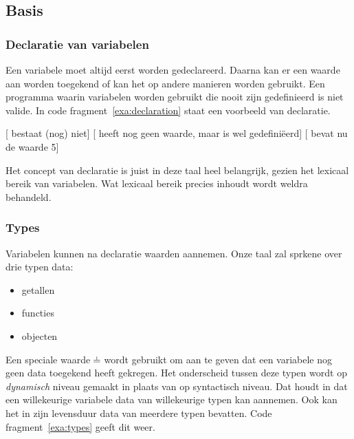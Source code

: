 \subsection{Basis}

\subsubsection{Declaratie van variabelen}

Een variabele moet altijd eerst worden gedeclareerd. Daarna kan er een waarde aan worden toegekend of kan het op andere manieren worden gebruikt. Een programma waarin variabelen worden gebruikt die nooit zijn gedefinieerd is niet valide. In code fragment~\ref{exa:declaration} staat een voorbeeld van declaratie.

\begin{NoBreak}
\codeFragmentCaption
\begin{codelines}
  \codeLine{}[ bestaat (nog) niet]
  [ heeft nog geen waarde, maar is wel gedefiniëerd]
  [ bevat nu de waarde 5]
\end{codelines}
\end{NoBreak}

Het concept van declaratie is juist in deze taal heel belangrijk, gezien het lexicaal bereik van variabelen. Wat lexicaal bereik precies inhoudt wordt weldra behandeld.

\subsubsection{Types}
\label{subsec:taal-types}

Variabelen kunnen na declaratie waarden aannemen. Onze taal zal sprkene over drie typen data:
\begin{itemize}
  \item getallen
  \item functies
  \item objecten
\end{itemize}
Een speciale waarde $\nil$ wordt gebruikt om aan te geven dat een variabele nog geen data toegekend heeft gekregen. Het onderscheid tussen deze typen wordt op \emph{dynamisch} niveau gemaakt in plaats van op syntactisch niveau. Dat houdt in dat een willekeurige variabele data van willekeurige typen kan aannemen. Ook kan het in zijn levensduur data van meerdere typen bevatten. Code fragment~\ref{exa:types} geeft dit weer.

